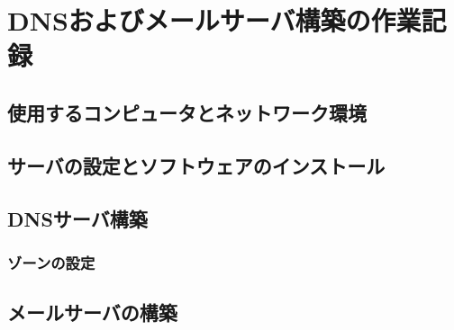 \chapter{DNSおよびメールサーバ構築の作業記録}
\section{使用するコンピュータとネットワーク環境}
\section{サーバの設定とソフトウェアのインストール}
\section{DNSサーバ構築}
\subsection{ゾーンの設定}\label{chap:ゾーンの設定}
\section{メールサーバの構築}